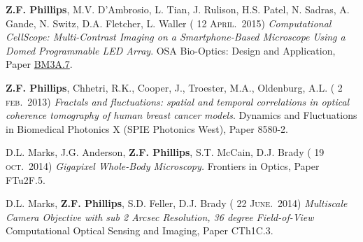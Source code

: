 \documentclass[12pt,letterpaper]{article}
\renewcommand{\date}[1]{{} #1}
\begin{document}
\textbf{Z.F. Phillips}, M.V. D'Ambrosio, L. Tian, J. Rulison, H.S. Patel, N. Sadras, A. Gande, N. Switz,  \linebreak D.A. Fletcher, L. Waller (\date{12 \textsc{April.}~2015})
\emph{Computational CellScope: Multi-Contrast Imaging on a  \linebreak Smartphone-Based Microscope Using a Domed Programmable LED Array}. OSA Bio-Optics:  \linebreak Design and Application, Paper \href{https://www.osapublishing.org/abstract.cfm?uri=BODA-2015-BM3A.7}{BM3A.7}.
\medskip

\textbf{Z.F. Phillips}, Chhetri, R.K., Cooper, J., Troester, M.A., Oldenburg, A.L. (\date{2 \textsc{feb.}~2013})
\emph{Fractals and  \linebreak fluctuations: spatial and temporal correlations in optical coherence tomography of human breast  \linebreak cancer models}. Dynamics and Fluctuations in Biomedical Photonics X (SPIE Photonics West), Paper 8580-2.
\medskip

D.L. Marks, J.G. Anderson, \textbf{Z.F. Phillips}, S.T. McCain, D.J. Brady (\date{19 \textsc{oct.}~2014})
\emph{Gigapixel  \linebreak Whole-Body Microscopy.} Frontiers in Optics, Paper FTu2F.5.
\medskip

D.L. Marks, \textbf{Z.F. Phillips}, S.D. Feller, D.J. Brady (\date{22 \textsc{June.}~2014})
\emph{Multiscale Camera Objective with sub 2 Arcsec Resolution, 36 degree Field-of-View} Computational Optical Sensing and Imaging,  \linebreak Paper CTh1C.3.
\medskip
\end{document}

